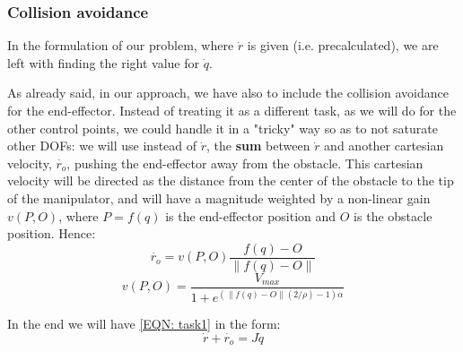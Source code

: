 \documentclass[12pt, a4paper]{article}
\begin{document}
\subsubsection{Collision avoidance}
In the formulation of our problem, where $\dot{r}$ is given (i.e. precalculated), we are left with finding the right value for $\dot{q}$.

As already said, in our approach, we have also to include the collision avoidance for the end-effector. Instead of treating it as a different task, as we will do for the other control points, we could handle it in a "tricky" way so as to not saturate other DOFs: we will use instead of $\dot{r}$, the \textbf{sum} between $\dot{r}$ and another cartesian velocity, $\dot{r_o}$, pushing the end-effector away from the obstacle. This cartesian velocity will be directed as the distance from the center of the obstacle to the tip of the manipulator, and will have a magnitude weighted by a non-linear gain $v(P,O)$, where $P = f(q)$ is the end-effector position and $O$ is the obstacle position.
Hence:
\begin{equation}\label{repulsive_dir}
\dot{r_o} = v(P,O)\frac{f(q) - O}{\lVert f(q) - O \rVert}
\end{equation}
\begin{equation}\label{repulsive_mag}
v(P,O) = \frac{V_{max}}{1+e^{(\lVert f(q) -O \rVert(2/\rho)-1)\alpha}}
\end{equation}

In the end we will have \eqref{EQN: task1} in the form: 
\[
\dot{r} + \dot{r_o} = J\dot{q}
\]
\end{document}
